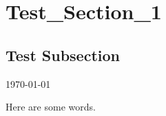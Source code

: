\section{Test_Section_1}
\subsection{Test Subsection}
\hfill \today

Here are some words.

\newpage
